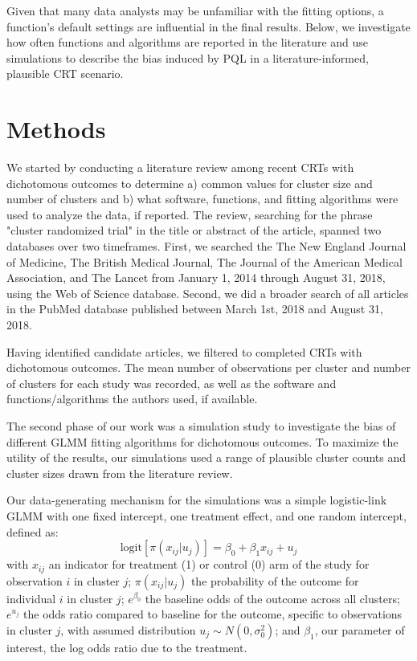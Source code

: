 \documentclass{article}
\begin{document}
\begin{flushleft}
Given that many data analysts may be unfamiliar with the fitting options, a function's default settings are influential in the final results. Below, we investigate how often functions and algorithms are reported in the literature and use simulations to describe the bias induced by PQL in a literature-informed, plausible CRT scenario.




\section{Methods}

We started by conducting a literature review among recent CRTs with dichotomous outcomes to determine a) common values for cluster size and number of clusters and b) what software, functions, and fitting algorithms were used to analyze the data, if reported. The review, searching for the phrase "cluster randomized trial" in the title or abstract of the article, spanned two databases over two timeframes. First, we searched the The New England Journal of Medicine, The British Medical Journal, The Journal of the American Medical Association, and The Lancet from January 1, 2014 through August 31, 2018, using the Web of Science database. Second, we did a broader search of all articles in the PubMed database published between March 1st, 2018 and August 31, 2018. 

Having identified candidate articles, we filtered to completed CRTs with dichotomous outcomes. The mean number of observations per cluster and number of clusters for each study was recorded, as well as the software and functions/algorithms the authors used, if available.

The second phase of our work was a simulation study to investigate the bias of different GLMM fitting algorithms for dichotomous outcomes. To maximize the utility of the results, our simulations used a range of plausible cluster counts and cluster sizes drawn from the literature review.

Our data-generating mechanism for the simulations was a simple logistic-link GLMM with one fixed intercept, one treatment effect, and one random intercept, defined as:
\begin{equation}
    \text{logit}[\pi(x_{ij}|u_j)]=\beta_0 + \beta_1 x_{ij} + u_j
\end{equation}
with $x_{ij}$ an indicator for treatment (1) or control (0) arm of the study for observation $i$ in cluster $j$; $\pi(x_{ij}|u_j)$ the probability of the outcome for individual $i$ in cluster $j$; $e^{\beta_0}$ the baseline odds of the outcome across all clusters; $e^{u_j}$ the odds ratio compared to baseline for the outcome, specific to observations in cluster $j$, with assumed distribution $u_j \sim N(0, \sigma_{0}^2)$; and $\beta_1$, our parameter of interest, the log odds ratio due to the treatment. 


\end{flushleft}
\end{document}
